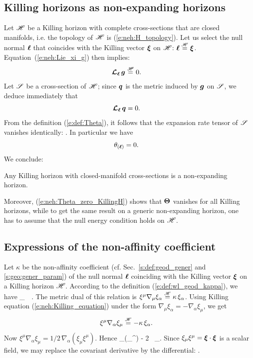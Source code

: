 \subsection{Killing horizons as non-expanding horizons}

Let $\mathscr{H}$ be a Killing horizon with complete cross-sections that are closed manifolds,
i.e. the topology of $\mathscr{H}$ is (\ref{e:neh:H_topology}). Let us select the null normal $\bm{\ell}$
that coincides with the Killing vector $\bm{\xi}$ on $\mathscr{H}$:
$\bm{\ell} \stackrel{\mathscr{H}}{=} \bm{\xi}$.
Equation~(\ref{e:neh:Lie_xi_g}) then implies:
\[
    \bm{\mathcal{L}}_{\bm{\ell}}\, \bm{g} \stackrel{\mathscr{H}}{=} 0 .
\]
Let $\mathscr{S}$ be a cross-section of $\mathscr{H}$; since $\bm{q}$ is the metric induced by $\bm{g}$
on $\mathscr{S}$, we deduce immediately that
\[
    \bm{\mathcal{L}}_{\bm{\ell}}\, \bm{q} = 0 .
\]
From the definition (\ref{e:def:Theta}), it follows that the expansion rate
tensor of $\mathscr{S}$ vanishes identically:
\be \label{e:neh:Theta_zero_KillingH}
   .
\ee
In particular we have
\[
    \theta_{(\bm{\ell})} = 0 .
\]
We conclude:
\begin{prop}
Any Killing horizon with closed-manifold cross-sections is a non-expanding horizon.
\end{prop}
Moreover, (\ref{e:neh:Theta_zero_KillingH}) shows that $\bm{\Theta}$ vanishes
for all Killing horizons, while to get the same result on a generic non-expanding
horizon, one has to assume that the null energy condition holds on $\mathscr{H}$.

\subsection{Expressions of the non-affinity coefficient}

Let $\kappa$ be the non-affinity coefficient
(cf. Sec.~\ref{s:def:geod_gener} and \ref{s:geo:gener_param})
of the null normal $\bm{\ell}$ coinciding with the Killing vector $\bm{\xi}$
on a Killing horizon $\mathscr{H}$. According to the definition
(\ref{e:def:wl_geod_kappa}), we have
\be \label{e:neh:xi_nab_xi_kappa}
    \wnab_{\w{\xi}}\, \w{\xi} \equalH \kappa \, \w{\xi} .
\ee
The metric dual of this relation is
$\xi^\mu \nabla_\mu \xi_\alpha \stackrel{\mathscr{H}}{=} \kappa \, \xi_\alpha$.
Using Killing equation (\ref{e:neh:Killing_equation}) under the form
$\nabla_\mu \xi_\alpha = - \nabla_\alpha \xi_\mu$, we get
\[
    \xi^\mu \nabla_\alpha \xi_\mu \stackrel{\mathscr{H}}{=} - \kappa \, \xi_\alpha .
\]
Now $\xi^\mu \nabla_\alpha \xi_\mu = 1/2 \, \nabla_\alpha (\xi_\mu \xi^\mu)$.
Hence
\be
    \nabla_\alpha (\xi_\mu \xi^\mu) \equalH - 2 \kappa \, \xi_\alpha.
\ee
Since $\xi_\mu \xi^\mu = \bm{\xi}\cdot\bm{\xi}$ is a scalar field, we may
replace the covariant derivative by the differential:
\be \label{e:neh:dxi2_kappa}
    \encadre{ \dd (\w{\xi}\cdot\w{\xi}) \equalH - 2 \kappa \, \uu{\xi} } .
\ee

